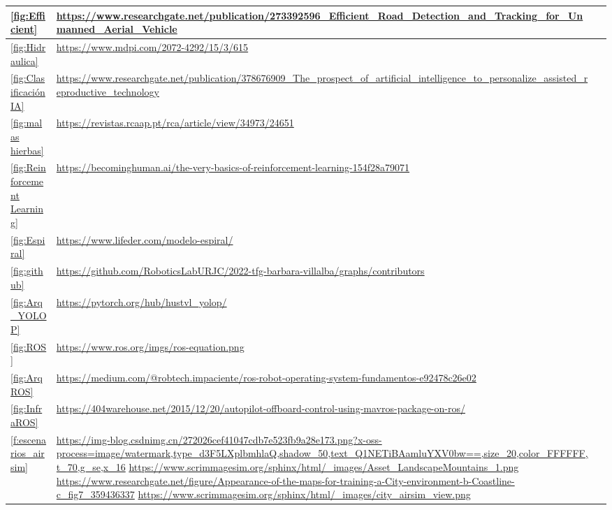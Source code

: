 \begin{tabular}{ | m{4cm} | m{10cm}| m{1cm} | }

    \hline
    \ref{fig:Efficient} & \url{https://www.researchgate.net/publication/273392596_Efficient_Road_Detection_and_Tracking_for_Unmanned_Aerial_Vehicle} \\
    \hline
    \ref{fig:Hidraulica} & \url{https://www.mdpi.com/2072-4292/15/3/615} \\
    \hline
    \ref{fig:ClasificaciónIA} & \url{https://www.researchgate.net/publication/378676909_The_prospect_of_artificial_intelligence_to_personalize_assisted_reproductive_technology} \\
    \hline
    \ref{fig:malas hierbas} & \url{https://revistas.rcaap.pt/rca/article/view/34973/24651} \\
    \hline
    \ref{fig:Reinforcement Learning} & \url{https://becominghuman.ai/the-very-basics-of-reinforcement-learning-154f28a79071} \\
    \hline
    \ref{fig:Espiral} & \url{https://www.lifeder.com/modelo-espiral/} \\
    \hline 
    \ref{fig:github} & \url{https://github.com/RoboticsLabURJC/2022-tfg-barbara-villalba/graphs/contributors} \\
    \hline  
    \ref{fig:Arq_YOLOP} & \url{https://pytorch.org/hub/hustvl_yolop/} \\
    \hline
    \ref{fig:ROS} & \url{https://www.ros.org/imgs/ros-equation.png} \\
    \hline
    \ref{fig:ArqROS} & \url{https://medium.com/@robtech.impaciente/ros-robot-operating-system-fundamentos-e92478c26e02} \\
    \hline
    \ref{fig:InfraROS} & \url{https://404warehouse.net/2015/12/20/autopilot-offboard-control-using-mavros-package-on-ros/} \\
    \hline
    \ref{f:escenarios_airsim} & \url{https://img-blog.csdnimg.cn/272026cef41047cdb7e523fb9a28e173.png?x-oss-process=image/watermark,type_d3F5LXplbmhlaQ,shadow_50,text_Q1NETiBAamluYXV0bw==,size_20,color_FFFFFF,t_70,g_se,x_16} \newline
    \url{https://www.scrimmagesim.org/sphinx/html/_images/Asset_LandscapeMountains_1.png} \newline
    \url{https://www.researchgate.net/figure/Appearance-of-the-maps-for-training-a-City-environment-b-Coastline-c_fig7_359436337} \newline
    \url{https://www.scrimmagesim.org/sphinx/html/_images/city_airsim_view.png} \newline

\end{tabular}

